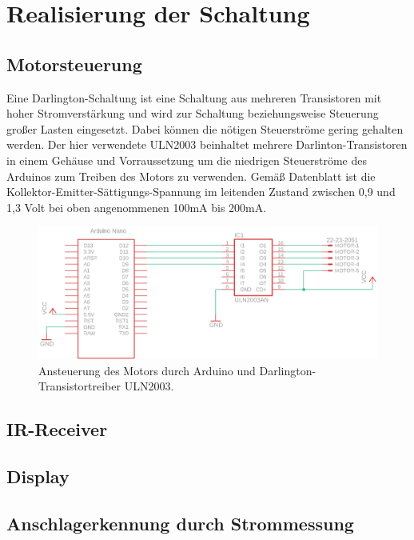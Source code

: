 \documentclass[11pt, titlepage, fleqn]{report}
\begin{document}
		\section{Realisierung der Schaltung}
			\subsection{Motorsteuerung}
				Eine Darlington-Schaltung ist eine Schaltung aus mehreren Transistoren mit hoher Stromverstärkung und wird zur Schaltung beziehungsweise Steuerung großer 
				Lasten eingesetzt. Dabei können die nötigen Steuerströme gering gehalten werden. Der hier verwendete ULN2003 beinhaltet mehrere Darlinton-Transistoren in einem 
				Gehäuse und Vorraussetzung um die niedrigen Steuerströme des Arduinos zum Treiben des Motors zu verwenden. Gemäß Datenblatt ist die Kollektor-Emitter-Sättigungs-Spannung im leitenden 
				Zustand zwischen 0,9 und 1,3 Volt bei oben angenommenen 100mA bis 200mA.
				\begin{figure}[htbp]
					\centering
					\includegraphics[width=\linewidth]{./img/Motorsteuerung.png}
					\caption{ Ansteuerung des Motors durch Arduino und  Darlington-Transistortreiber ULN2003.
					\label{fig:imgMotorsteuerung}}
				\end{figure}
			\subsection{IR-Receiver}
			\subsection{Display}
			\subsection{Anschlagerkennung durch Strommessung}
\end{document}
